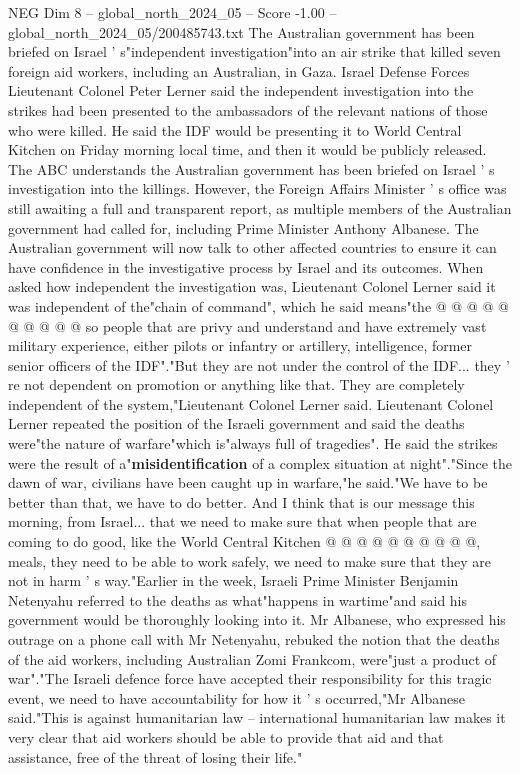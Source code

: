 \begin{textsample}{NEG Dim 8 – global\_north\_2024\_05 – Score -1.00 – global\_north\_2024\_05/200485743.txt}  \label{ex:f8_neg_272}
The Australian government has been briefed on Israel ' s"independent investigation"into an air strike that killed seven foreign aid workers, including an Australian, in Gaza.
Israel Defense Forces Lieutenant Colonel Peter Lerner said the independent investigation into the strikes had been presented to the ambassadors of the relevant nations of those who were killed.
He said the IDF would be presenting it to World Central Kitchen on Friday morning local time, and then it would be publicly released.
The ABC understands the Australian government has been briefed on Israel ' s investigation into the killings.
However, the Foreign Affairs Minister ' s office was still awaiting a full and transparent report, as multiple members of the Australian government had called for, including Prime Minister Anthony Albanese.
The Australian government will now talk to other affected countries to ensure it can have confidence in the investigative process by Israel and its outcomes.
When asked how independent the investigation was, Lieutenant Colonel Lerner said it was independent of the"chain of command", which he said means"the @ @ @ @ @ @ @ @ @ @ so people that are privy and understand and have extremely vast military experience, either pilots or infantry or artillery, intelligence, former senior officers of the IDF"."But they are not under the control of the IDF... they ' re not dependent on promotion or anything like that.
They are completely independent of the system,"Lieutenant Colonel Lerner said.
Lieutenant Colonel Lerner repeated the position of the Israeli government and said the deaths were"the nature of warfare"which is"always full of tragedies".
He said the strikes were the result of a"\textbf{misidentification} of a complex situation at night"."Since the dawn of war, civilians have been caught up in warfare,"he said."We have to be better than that, we have to do better.
And I think that is our message this morning, from Israel... that we need to make sure that when people that are coming to do good, like the World Central Kitchen @ @ @ @ @ @ @ @ @ @, meals, they need to be able to work safely, we need to make sure that they are not in harm ' s way."Earlier in the week, Israeli Prime Minister Benjamin Netenyahu referred to the deaths as what"happens in wartime"and said his government would be thoroughly looking into it.
Mr Albanese, who expressed his outrage on a phone call with Mr Netenyahu, rebuked the notion that the deaths of the aid workers, including Australian Zomi Frankcom, were"just a product of war"."The Israeli defence force have accepted their responsibility for this tragic event, we need to have accountability for how it ' s occurred,"Mr Albanese said."This is against humanitarian law -- international humanitarian law makes it very clear that aid workers should be able to provide that aid and that assistance, free of the threat of losing their life."

\end{textsample}
